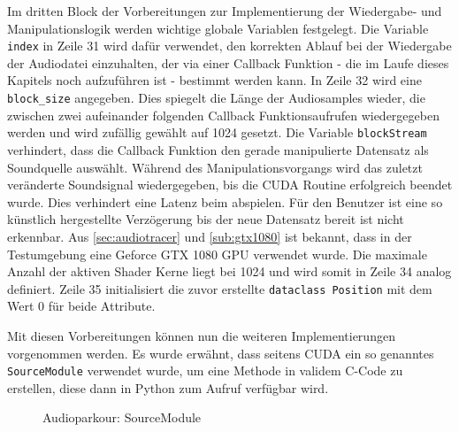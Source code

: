 Im dritten Block der Vorbereitungen zur Implementierung der Wiedergabe- und Manipulationslogik werden wichtige globale Variablen festgelegt. Die Variable \texttt{index} in Zeile 31 wird dafür verwendet, den korrekten Ablauf bei der Wiedergabe der Audiodatei einzuhalten, der via einer Callback Funktion - die im Laufe dieses Kapitels noch aufzuführen ist - bestimmt werden kann. In Zeile 32 wird eine \texttt{block\_size} angegeben. Dies spiegelt die Länge der Audiosamples wieder, die zwischen zwei aufeinander folgenden Callback Funktionsaufrufen wiedergegeben werden und wird zufällig gewählt auf 1024 gesetzt. Die Variable \texttt{blockStream} verhindert, dass die Callback Funktion den gerade manipulierte Datensatz als Soundquelle auswählt. Während des Manipulationsvorgangs wird das zuletzt veränderte Soundsignal wiedergegeben, bis die CUDA Routine erfolgreich beendet wurde. Dies verhindert eine Latenz beim abspielen. Für den Benutzer ist eine so künstlich hergestellte Verzögerung bis der neue Datensatz bereit ist nicht erkennbar. Aus \ref{sec:audiotracer} und \ref{sub:gtx1080} ist bekannt, dass in der Testumgebung eine Geforce GTX 1080 GPU verwendet wurde. Die maximale Anzahl der aktiven Shader Kerne liegt bei 1024 und wird somit in Zeile 34 analog definiert. Zeile 35 initialisiert die zuvor erstellte \texttt{dataclass Position} mit dem Wert 0 für beide Attribute. 

Mit diesen Vorbereitungen können nun die weiteren Implementierungen vorgenommen werden. Es wurde erwähnt, dass seitens CUDA ein so genanntes \texttt{SourceModule} verwendet wurde, um eine Methode in validem C-Code zu erstellen, diese dann in Python zum Aufruf verfügbar wird. 

\begin{figure}[h!]
	
	\caption{Audioparkour: SourceModule}
	\label{fig:audioparkour_SourceModule}
\end{figure}

